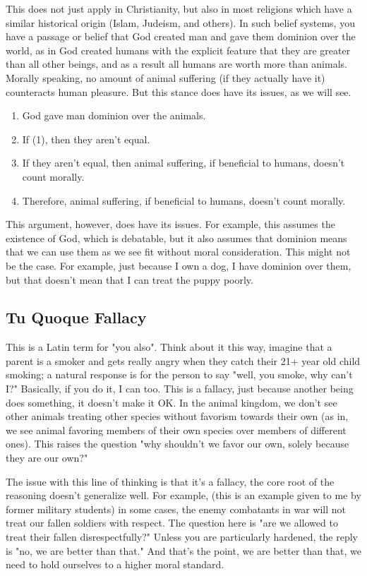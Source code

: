 This does not just apply in Christianity, but also in most religions which have a similar historical origin (Islam, Judeism, and others). In such belief systems, you have a passage or belief that God created man and gave them dominion over the world, as in God created humans with the explicit feature that they are greater than all other beings, and as a result all humans are worth more than animals. Morally speaking, no amount of animal suffering (if they actually have it) counteracts human pleasure.  But this stance does have its issues, as we will see.
\begin{enumerate}
    \item God gave man dominion over the animals.
    \item If (1), then they aren't equal.
    \item If they aren't equal, then animal suffering, if beneficial to humans, doesn't count morally.
    \item Therefore, animal suffering, if beneficial to humans, doesn't count morally. 
\end{enumerate}
This argument, however, does have its issues. For example, this assumes the existence of God, which is debatable, but it also assumes that dominion means that we can use them as we see fit without moral consideration. This might not be the case. For example, just because I own a dog, I have dominion over them, but that doesn't mean that I can treat the puppy poorly.  

\subsection{Tu Quoque Fallacy}

This is a Latin term for "you also". Think about it this way, imagine that a parent is a smoker and gets really angry when they catch their 21+ year old child smoking; a natural response is for the person to say "well, you smoke, why can't I?" Basically, if you do it, I can too. This is a fallacy, just because another being does something, it doesn't make it OK. In the animal kingdom, we don't see other animals treating other species without favorism towards their own (as in, we see animal favoring members of their own species over members of different ones). This raises the question "why shouldn't we favor our own, solely because they are our own?" 

The issue with this line of thinking is that it's a fallacy, the core root of the reasoning doesn't generalize well. For example, (this is an example given to me by former military students) in some cases, the enemy combatants in war will not treat our fallen soldiers with respect. The question here is "are we allowed to treat their fallen disrespectfully?" Unless you are particularly hardened, the reply is "no, we are better than that." And that's the point, we are better than that, we need to hold ourselves to a higher moral standard.


